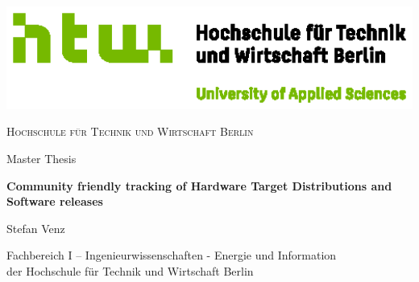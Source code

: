 
\begin{titlepage}
  \begin{center}
	  


	\centering
	\includegraphics[width=15cm]{figures/Q03_HTW_Berlin_Logo_quer_pos_FARBIG_RGB.eps}\\
	\vspace{0.8em}
	\LARGE 

	\textsc{Hochschule für Technik und Wirtschaft Berlin}
	\vspace{1.5cm}
	
	\Huge{Master Thesis}

    \vspace{1cm}

    \sffamily \LARGE \textbf{Community friendly tracking of Hardware Target Distributions and Software releases}

    \vspace{1.5cm}

    \vspace{.1cm}

    \large Stefan Venz

    \vspace{.8cm}



    \normalsize Fachbereich I -- Ingenieurwissenschaften - Energie und Information\\
    \normalsize der Hochschule für Technik und Wirtschaft Berlin\\


\end{center}
\end{titlepage}
